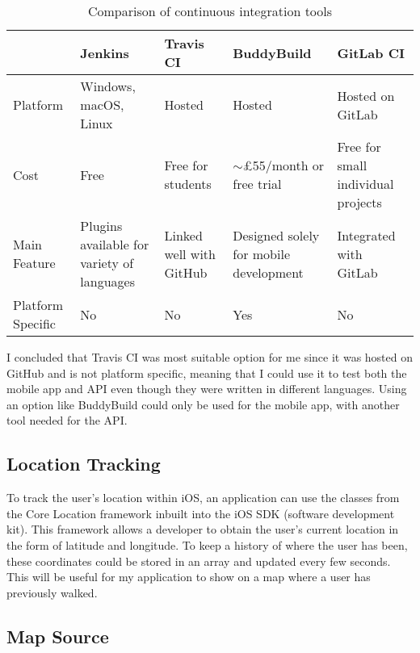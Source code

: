 \begin{table}[hbt]
  \centering
  \begin{tabular}{|m{1.5cm}||M{3cm}|M{3cm}|M{3cm}|M{3cm}|}
    \hline
     & \textbf{Jenkins} & \textbf{Travis CI} & \textbf{BuddyBuild} & \textbf{GitLab CI} \\
    \hline
    \hline
    Platform & Windows, macOS, Linux & Hosted & Hosted & Hosted on GitLab\\
    \hline
    Cost & Free & Free for students & $\sim$\pounds55/month or free trial & Free for small individual projects\\
    \hline
    Main Feature & Plugins available for variety of languages & Linked well with GitHub & Designed solely for mobile development & Integrated with GitLab\\
    \hline
    Platform Specific & No & No & Yes & No\\
    \hline
  \end{tabular}
  \caption{Comparison of continuous integration tools}
  \label{table:ci-tools-options}
\end{table}

I concluded that Travis CI was most suitable option for me since it was hosted on GitHub and is not platform specific, meaning that I could use it to test both the mobile app and API even though they were written in different languages. Using an option like BuddyBuild could only be used for the mobile app, with another tool needed for the API.

\subsection{Location Tracking}

To track the user's location within iOS, an application can use the classes from the Core Location framework \cite{AppleInc.} inbuilt into the iOS SDK (software development kit). This framework allows a developer to obtain the user's current location in the form of latitude and longitude. To keep a history of where the user has been, these coordinates could be stored in an array and updated every few seconds. This will be useful for my application to show on a map where a user has previously walked.


\subsection{Map Source} \label{subsection:background-apis}

